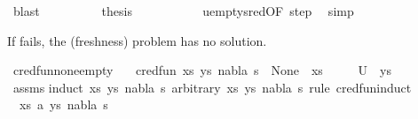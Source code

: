 \begin{isabellebody}
\ blast\isanewline
\ \ \ \ \ \ \isamarkupfalse%
\ \isamarkupfalse%
\ {\isacharquery}{\kern0pt}thesis\ \isanewline
\ \ \ \ \ \ \ \ \isamarkupfalse%
\ u{\isacharunderscore}{\kern0pt}empty{\isacharunderscore}{\kern0pt}sred{\isacharbrackleft}{\kern0pt}OF\ step{\isacharbrackright}{\kern0pt}\ \isamarkupfalse%
\ simp\isanewline
\ \ \ \ \isamarkupfalse%
\isanewline
\ \ \isamarkupfalse%
\isanewline
{}\isamarkupfalse%
%
\endisatagproof
{\isafoldproof}%
%
\isadelimproof
%
\endisadelimproof
%
\begin{isamarkuptext}%
If  fails, the (freshness) problem has no solution.%
\end{isamarkuptext}\isamarkuptrue%
\isamarkupfalse%
\ cred{\isacharunderscore}{\kern0pt}fun{\isacharunderscore}{\kern0pt}none{\isacharunderscore}{\kern0pt}empty{\isacharcolon}{\kern0pt}\isanewline
\ \ \ {\isachardoublequoteopen}cred{\isacharunderscore}{\kern0pt}fun\ {\isacharparenleft}{\kern0pt}{\isacharparenleft}{\kern0pt}xs{\isacharcomma}{\kern0pt}\ ys{\isacharparenright}{\kern0pt}{\isacharcomma}{\kern0pt}\ nabla{\isacharcomma}{\kern0pt}\ s{\isacharparenright}{\kern0pt}\ {\isacharequal}{\kern0pt}\ None{\isachardoublequoteclose}\ \ {\isachardoublequoteopen}xs\ {\isacharequal}{\kern0pt}\ {\isacharbrackleft}{\kern0pt}{\isacharbrackright}{\kern0pt}{\isachardoublequoteclose}\isanewline
\ \ \ {\isachardoublequoteopen}U\ {\isacharparenleft}{\kern0pt}{\isacharbrackleft}{\kern0pt}{\isacharbrackright}{\kern0pt}{\isacharcomma}{\kern0pt}\ ys{\isacharparenright}{\kern0pt}\ {\isacharequal}{\kern0pt}\ {\isacharbraceleft}{\kern0pt}{\isacharbraceright}{\kern0pt}{\isachardoublequoteclose}\isanewline
%
\isadelimproof
\ \ %
\endisadelimproof
%
\isatagproof
{}\isamarkupfalse%
\ assms\isanewline
{}\isamarkupfalse%
{\isacharparenleft}{\kern0pt}induct\ {\isachardoublequoteopen}{\isacharparenleft}{\kern0pt}{\isacharparenleft}{\kern0pt}xs{\isacharcomma}{\kern0pt}\ ys{\isacharparenright}{\kern0pt}{\isacharcomma}{\kern0pt}\ nabla{\isacharcomma}{\kern0pt}\ s{\isacharparenright}{\kern0pt}{\isachardoublequoteclose}\ arbitrary{\isacharcolon}{\kern0pt}\ xs\ ys\ nabla\ s\ rule{\isacharcolon}{\kern0pt}\ cred{\isacharunderscore}{\kern0pt}fun{\isachardot}{\kern0pt}induct{\isacharparenright}{\kern0pt}\isanewline
\ \ \isamarkupfalse%
\ {\isacharparenleft}{\kern0pt}{}\ xs\ a\ ys\ nabla\ s{\isacharparenright}{\kern0pt}\isanewline

\end{isabellebody}
